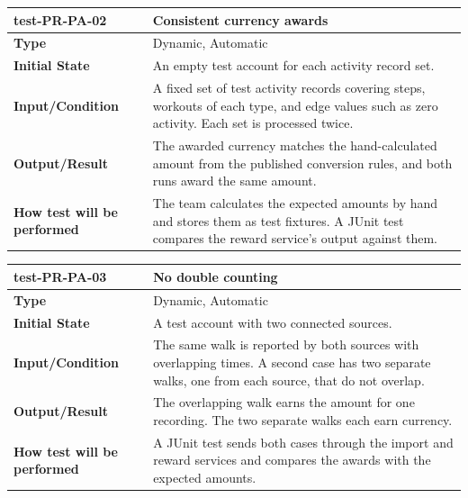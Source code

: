 \documentclass[12pt, titlepage]{article}
\begin{document}
\vspace{1em}

\noindent\begin{tabularx}{\textwidth}{>{\raggedright\arraybackslash}p{3.5cm}X}
  \toprule
  \textbf{test-PR-PA-02} & \textbf{Consistent currency awards}\\
  \midrule
  \textbf{Type} & Dynamic, Automatic\\
  \textbf{Initial State} & An empty test account for each activity record set.\\
  \textbf{Input/Condition} & A fixed set of test activity records covering steps, workouts of each type, and edge values such as zero activity. Each set is processed twice.\\
  \textbf{Output/Result} & The awarded currency matches the hand-calculated amount from the published conversion rules, and both runs award the same amount.\\
  \textbf{How test will be performed} & The team calculates the expected amounts by hand and stores them as test fixtures. A JUnit test compares the reward service's output against them.\\
  \bottomrule
\end{tabularx}

\vspace{1em}

\noindent\begin{tabularx}{\textwidth}{>{\raggedright\arraybackslash}p{3.5cm}X}
  \toprule
  \textbf{test-PR-PA-03} & \textbf{No double counting}\\
  \midrule
  \textbf{Type} & Dynamic, Automatic\\
  \textbf{Initial State} & A test account with two connected sources.\\
  \textbf{Input/Condition} & The same walk is reported by both sources with overlapping times. A second case has two separate walks, one from each source, that do not overlap.\\
  \textbf{Output/Result} & The overlapping walk earns the amount for one recording. The two separate walks each earn currency.\\
  \textbf{How test will be performed} & A JUnit test sends both cases through the import and reward services and compares the awards with the expected amounts.\\
  \bottomrule
\end{tabularx}

\vspace{1em}
\end{document}
